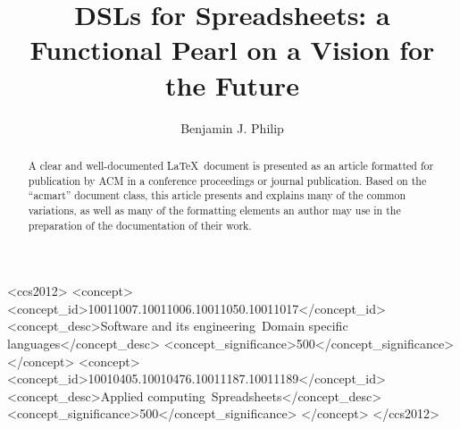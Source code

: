 \documentclass[acmsmall]{acmart}
\begin{document}
\title{DSLs for Spreadsheets: a Functional Pearl on a Vision for the Future}

\author{Benjamin J. Philip}

\begin{abstract}
  A clear and well-documented \LaTeX\ document is presented as an
  article formatted for publication by ACM in a conference proceedings
  or journal publication. Based on the ``acmart'' document class, this
  article presents and explains many of the common variations, as well
  as many of the formatting elements an author may use in the
  preparation of the documentation of their work.
\end{abstract}


\begin{CCSXML}
<ccs2012>
   <concept>
       <concept_id>10011007.10011006.10011050.10011017</concept_id>
       <concept_desc>Software and its engineering~Domain specific languages</concept_desc>
       <concept_significance>500</concept_significance>
       </concept>
   <concept>
       <concept_id>10010405.10010476.10011187.10011189</concept_id>
       <concept_desc>Applied computing~Spreadsheets</concept_desc>
       <concept_significance>500</concept_significance>
       </concept>
 </ccs2012>
\end{CCSXML}


\end{document}
